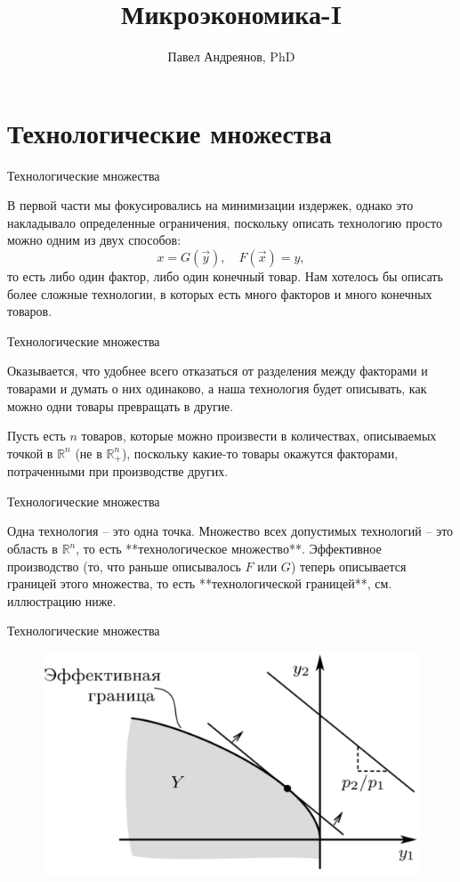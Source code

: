 \documentclass{beamer}
\title{
Микроэкономика-I
}
\author{
Павел Андреянов, PhD
}
\begin{document}
\maketitle

\section{Технологические множества}

\begin{frame}{Технологические множества}

В первой части мы фокусировались на минимизации издержек, однако это накладывало определенные ограничения, поскольку описать технологию просто можно одним из двух способов:
$$ x = G(\vec y), \quad F(\vec x) = y,$$
то есть либо один фактор, либо один конечный товар. Нам хотелось бы описать более сложные технологии, в которых есть много факторов и много конечных товаров.

\end{frame}

\begin{frame}{Технологические множества}

Оказывается, что удобнее всего отказаться от разделения между факторами и товарами и думать о них одинаково, а наша технология будет описывать, как можно одни товары превращать в другие.

Пусть есть $n$ товаров, которые можно произвести в количествах, описываемых точкой в $\mathbb{R}^n$ (не в $\mathbb{R}^n_+$), поскольку какие-то товары окажутся факторами, потраченными при производстве других. 

\end{frame}

\begin{frame}{Технологические множества}

Одна технология – это одна точка. Множество всех допустимых технологий – это область в $\mathbb{R}^n$, то есть **технологическое множество**. Эффективное производство (то, что раньше описывалось $F$ или $G$) теперь описывается границей этого множества, то есть **технологической границей**, см. иллюстрацию ниже.

\end{frame}

\begin{frame}{Технологические множества}

\begin{figure}[hbt]
\centering
\includegraphics[width=.8 \textwidth]{prod_set.png}
\end{figure}

\end{frame}
\end{document}
